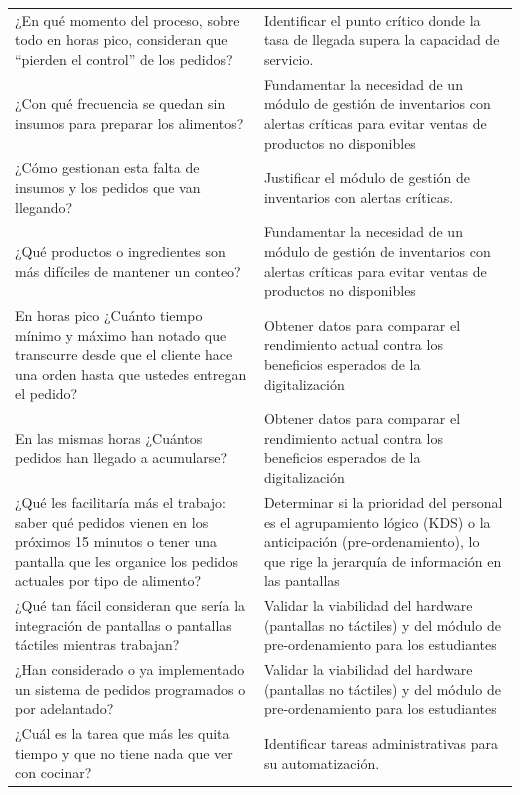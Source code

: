 \begin{longtable}[c]{p{5cm} p{9cm}}
\addlinespace
¿En qué momento del proceso, sobre todo en horas pico, consideran que ``pierden el control'' de los pedidos? & Identificar el punto crítico donde la tasa de llegada supera la capacidad de servicio. \\
\addlinespace
¿Con qué frecuencia se quedan sin insumos para preparar los alimentos? & Fundamentar la necesidad de un módulo de gestión de inventarios con alertas críticas para evitar ventas de productos no disponibles \\
\addlinespace
¿Cómo gestionan esta falta de insumos y los pedidos que van llegando? & Justificar el módulo de gestión de inventarios con alertas críticas. \\
\addlinespace
¿Qué productos o ingredientes son más difíciles de mantener un conteo? & Fundamentar la necesidad de un módulo de gestión de inventarios con alertas críticas para evitar ventas de productos no disponibles \\
\addlinespace
En horas pico ¿Cuánto tiempo mínimo y máximo han notado que transcurre desde que el cliente hace una orden hasta que ustedes entregan el pedido? & Obtener datos para comparar el rendimiento actual contra los beneficios esperados de la digitalización \\
\addlinespace
En las mismas horas ¿Cuántos pedidos han llegado a acumularse? & Obtener datos para comparar el rendimiento actual contra los beneficios esperados de la digitalización \\
\addlinespace
¿Qué les facilitaría más el trabajo: saber qué pedidos vienen en los próximos 15 minutos o tener una pantalla que les organice los pedidos actuales por tipo de alimento? & Determinar si la prioridad del personal es el agrupamiento lógico (KDS) o la anticipación (pre-ordenamiento), lo que rige la jerarquía de información en las pantallas \\
\addlinespace
¿Qué tan fácil consideran que sería la integración de pantallas o pantallas táctiles mientras trabajan? & Validar la viabilidad del hardware (pantallas no táctiles) y del módulo de pre-ordenamiento para los estudiantes \\
\addlinespace
¿Han considerado o ya implementado un sistema de pedidos programados o por adelantado? & Validar la viabilidad del hardware (pantallas no táctiles) y del módulo de pre-ordenamiento para los estudiantes \\
\addlinespace
¿Cuál es la tarea que más les quita tiempo y que no tiene nada que ver con cocinar? & Identificar tareas administrativas para su automatización. \\
\end{longtable}
\endgroup



